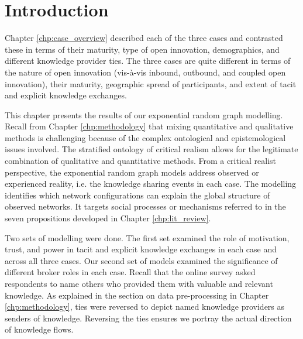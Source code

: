 \section{Introduction}

Chapter \ref{chp:case_overview} described each of the three cases and contrasted these in terms of their maturity, type of open innovation, demographics, and different knowledge provider ties. The three cases are quite different in terms of the nature of open innovation (vis-\`a-vis inbound, outbound, and coupled open innovation), their maturity, geographic spread of participants, and extent of tacit and explicit knowledge exchanges. \medskip

This chapter presents the results of our exponential random graph modelling. Recall from Chapter \ref{chp:methodology} that mixing quantitative and qualitative methods is challenging because of the complex ontological and epistemological issues involved. The stratified ontology of critical realism allows for the legitimate combination of qualitative and quantitative methods. From a critical realist perspective, the exponential random graph models address observed or experienced reality, i.e. the knowledge sharing events in each case. The modelling identifies which network configurations can explain the global structure of observed networks. It targets social processes or mechanisms referred to in the seven propositions developed in Chapter \ref{chp:lit_review}. \medskip

Two sets of modelling were done. The first set examined the role of motivation, trust, and power in tacit and explicit knowledge exchanges in each case and across all three cases. Our second set of models examined the significance of different broker roles in each case. Recall that the online survey asked respondents to name others who provided them with valuable and relevant knowledge. As explained in the section on data pre-processing in Chapter \ref{chp:methodology}, ties were reversed to depict named knowledge providers as senders of knowledge. Reversing the ties ensures we portray the actual direction of knowledge flows. \medskip

